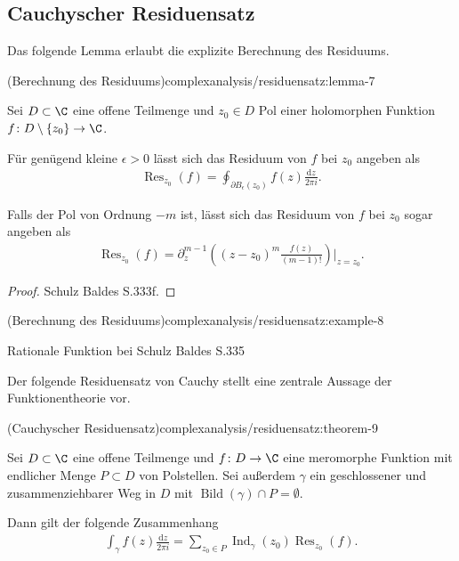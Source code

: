 \documentclass[letterpaper,10pt,german]{jupyterBook}
\begin{document}
\subsection{Cauchyscher Residuensatz}
\label{\detokenize{complexanalysis/residuensatz:cauchyscher-residuensatz}}
\par
Das folgende Lemma erlaubt die explizite Berechnung des Residuums.
\begin{lemma}{(Berechnung des Residuums)}{complexanalysis/residuensatz:lemma-7}



\par
Sei \(D \subset \C\) eine offene Teilmenge und \(z_0 \in D\) Pol einer holomorphen Funktion \(f \colon D \setminus \{z_0\} \rightarrow \C\).

\par
Für genügend kleine \(\epsilon > 0\) lässt sich das Residuum von \(f\) bei \(z_0\) angeben als
\begin{align*}
\operatorname{Res}_{z_0}(f) = \oint_{\partial B_\epsilon(z_0)} f(z) \frac{\mathrm{d}z}{2\pi i}.
\end{align*}
\par
Falls der Pol von Ordnung \(-m\) ist, lässt sich das Residuum von \(f\) bei \(z_0\) sogar angeben als
\begin{align*}
\operatorname{Res}_{z_0}(f) = \partial_z^{m-1}\left( (z-z_0)^m \frac{f(z)}{(m-1)!}\right)|_{z=z_0}.
\end{align*}\end{lemma}

\begin{proof}
 Schulz Baldes S.333f.
\end{proof}
\begin{example}{(Berechnung des Residuums)}{complexanalysis/residuensatz:example-8}



\par
Rationale Funktion bei Schulz Baldes S.335
\end{example}

\par
Der folgende Residuensatz von Cauchy stellt eine zentrale Aussage der Funktionentheorie vor.
\begin{theorem}{(Cauchyscher Residuensatz)}{complexanalysis/residuensatz:theorem-9}



\par
Sei \(D \subset \C\) eine offene Teilmenge und \(f \colon D \rightarrow \C\) eine meromorphe Funktion mit endlicher Menge \(P \subset D\) von Polstellen.
Sei außerdem \(\gamma\) ein geschlossener und zusammenziehbarer Weg in \(D\) mit \(\operatorname{Bild}(\gamma) \cap P = \emptyset\).

\par
Dann gilt der folgende Zusammenhang
\begin{align*}
\int_\gamma f(z) \frac{\mathrm{d}z}{2\pi i} = \sum_{z_0 \in P} \operatorname{Ind}_\gamma(z_0) \operatorname{Res}_{z_0}(f).
\end{align*}\end{theorem}
\end{document}
